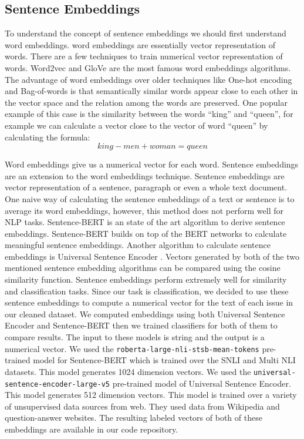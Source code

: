 \documentclass[conference]{IEEEtran}
\begin{document}
\subsection{Sentence Embeddings}
To understand the concept of sentence embeddings we should first understand word embeddings.
word embeddings are essentially vector representation of words. There are a few techniques to train
numerical vector representation of words. Word2vec \cite{mikolov2013efficient,mikolov2013distributed} 
and GloVe \cite{pennington2014glove} are the most famous word embeddings algorithms. The advantage of
word embeddings over older techniques like One-hot encoding and Bag-of-words is that semantically similar
words appear close to each other in the vector space and the relation among the words are preserved.
One popular example of this case is the similarity between the words ``king'' and ``queen'', for example
we can calculate a vector close to the vector of word ``queen'' by calculating the formula:
\begin{equation}
  king-men+woman=queen
\end{equation}

Word embeddings give us a numerical vector for each word. Sentence embeddings are an extension to 
the word embeddings technique. Sentence embeddings are vector representation of a sentence, paragraph 
or even a whole text document. One naive way of calculating the sentence embeddings of a text or sentence 
is to average its word embeddings, however, this method does not perform well for NLP tasks. 
Sentence-BERT \cite{reimers-2019-sentence-bert} is an state of the art 
algorithm to derive sentence embeddings. Sentence-BERT builds on top of the BERT \cite{devlin2019bert} networks 
to calculate meaningful sentence embeddings. Another algorithm to calculate sentence embeddings is 
Universal Sentence Encoder \cite{cer2018universal}. Vectors generated by both of the two mentioned sentence
embedding algorithms can be compared using the cosine similarity function. Sentence embeddings perform
extremely well for similarity and classification tasks. Since our task is classification, we decided to 
use these sentence embeddings to compute a numerical vector for the text of each issue in our 
cleaned dataset. We computed embeddings using both Universal Sentence Encoder and Sentence-BERT then we trained
classifiers for both of them to compare results. The input to these models is string and the output is 
a numerical vector. We used the \verb|roberta-large-nli-stsb-mean-tokens| pre-trained 
model for Sentence-BERT which is trained over the SNLI \cite{snli:emnlp2015} and Multi NLI \cite{N18-1101} datasets. 
This model generates 1024 dimension vectors. We used the 
\verb|universal-sentence-encoder-large-v5| pre-trained model of Universal Sentence Encoder. This model generates 
512 dimension vectors. This model is trained over a variety of unsupervised data sources from web. They used data
from Wikipedia and question-answer websites. The resulting labeled vectors of both of these embeddings 
are available in our code repository.
\end{document}
